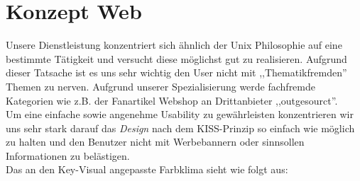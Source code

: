 \chapter{Konzept Web}

Unsere Dienstleistung konzentriert sich ähnlich der Unix Philosophie auf eine
bestimmte Tätigkeit und versucht diese möglichst gut zu realisieren. Aufgrund
dieser Tatsache ist es uns sehr wichtig den User nicht mit ,,Thematikfremden''
Themen zu nerven. Aufgrund unserer Spezialisierung werde fachfremde Kategorien
wie z.B. der Fanartikel Webshop an Drittanbieter ,,outgesourct''.
\\
Um eine einfache sowie angenehme Usability zu gewährleisten konzentrieren wir
uns sehr stark darauf das \emph{Design} nach dem KISS-Prinzip so einfach wie
möglich zu halten und den Benutzer nicht mit Werbebannern oder sinnsollen
Informationen zu belästigen.
\\
Das an den Key-Visual angepasste Farbklima sieht wie folgt aus:
